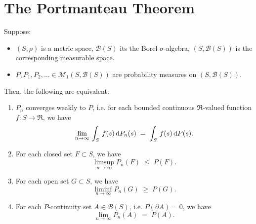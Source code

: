 

\section{The Portmanteau Theorem}
\setcounter{theorem}{0}
\setcounter{equation}{0}

\renewcommand{\theenumi}{\roman{enumi}}
\renewcommand{\labelenumi}{\textnormal{(\theenumi)}$\;\;$}

\begin{theorem}
\mbox{}\vskip 0.2cm
\noindent
Suppose:
\begin{itemize}
\item	$\left(S,\rho\right)$ is a metric space, $\mathcal{B}(S)$ its the Borel $\sigma$-algebra,
		$\left(S,\mathcal{B}(S)\right)$ is the corresponding measurable space.
\item	$P, P_{1}, P_{2}, \ldots \in \mathcal{M}_{1}\!\left(S,\mathcal{B}(S)\right)$
		are probability measures on $\left(S,\mathcal{B}(S)\right)$.
\end{itemize}
Then, the following are equivalent:
\begin{enumerate}
\item	$P_{n}$ converges weakly to $P$,
		i.e. for each bounded continuous $\Re$-valued function $f : S \longrightarrow \Re$, we have
		\begin{equation*}
		\lim_{n\rightarrow\infty}\,\int_{S}\,f(s)\,\textnormal{d} P_{n}(s) \;=\; \int_{S}\,f(s)\,\textnormal{d} P(s).
		\end{equation*}
\item	For each closed set $F \subset S$, we have
		\begin{equation*}
		\limsup_{n\rightarrow\infty}P_{n}(F) \;\leq\; P(F).
		\end{equation*}
\item	For each open set $G \subset S$, we have
		\begin{equation*}
		\liminf_{n\rightarrow\infty}P_{n}(G) \;\geq\; P(G).
		\end{equation*}
\item	For each $P$-continuity set $A \in \mathcal{B}(S)$, i.e. $P(\partial A) = 0$, we have
		\begin{equation*}
		\lim_{n\rightarrow\infty}P_{n}(A) \;=\; P(A).
		\end{equation*}
\end{enumerate}
\end{theorem}

